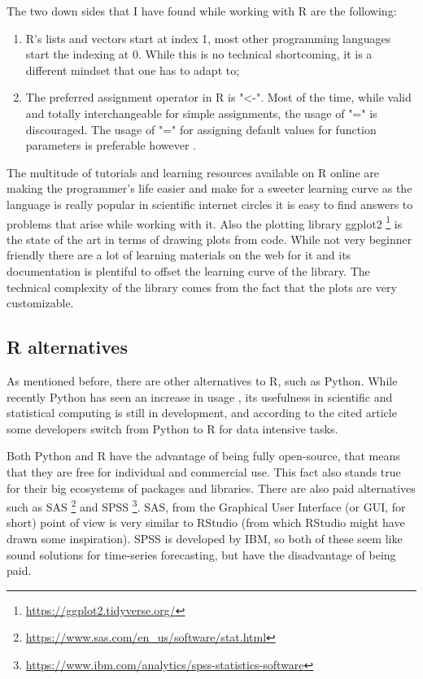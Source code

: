 \documentclass[12pt,a4paper,titlepage]{report}
\begin{document}
The two down sides that I have found while working with R are the following:
\begin{enumerate}
    \item R's lists and vectors start at index 1, most other programming languages start the indexing at 0. While this is no technical shortcoming, it is a different mindset that one has to adapt to;
    \item The preferred assignment operator in R is "<-". Most of the time, while valid and totally interchangeable for simple assignments, the usage of "=" is discouraged. The usage of "=" for assigning default values for function parameters is preferable however \cite{RassignOps}.
\end{enumerate}

The multitude of tutorials and learning resources available on R online are making the programmer's life easier and make for a sweeter learning curve as the language is really popular in scientific internet circles it is easy to find answers to problems that arise while working with it. Also the plotting library ggplot2 \footnote{\url{https://ggplot2.tidyverse.org/}} is the state of the art in terms of drawing plots from code. While not very beginner friendly there are a lot of learning materials on the web for it and its documentation is plentiful to offset the learning curve of the library. The technical complexity of the library comes from the fact that the plots are very customizable.

\subsection{R alternatives}
As mentioned before, there are other alternatives to R, such as Python. While recently Python has seen an increase in usage \cite{pythongrowth}, its usefulness in scientific and statistical computing is still in development, and according to the cited article some developers switch from Python to R for data intensive tasks.

Both Python and R have the advantage of being fully open-source, that means that they are free for individual and commercial use. This fact also stands true for their big ecosystems of packages and libraries. There are also paid alternatives such as SAS \footnote{\url{https://www.sas.com/en_us/software/stat.html}} and SPSS \footnote{\url{https://www.ibm.com/analytics/spss-statistics-software}}. SAS, from the Graphical User Interface (or GUI, for short) point of view is very similar to RStudio (from which RStudio might have drawn some inspiration). SPSS is developed by IBM, so both of these seem like sound solutions for time-series forecasting, but have the disadvantage of being paid.
\end{document}
